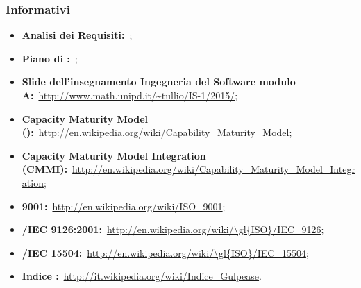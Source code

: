 	\subsubsection{Informativi}
	\begin{itemize}
		\item \textbf{Analisi dei Requisiti:}\ \ARdoc;
		\item \textbf{Piano di :}\ \PPdoc;
		\item \textbf{Slide dell’insegnamento Ingegneria del Software modulo A:}\ \url{http://www.math.unipd.it/~tullio/IS-1/2015/};
		\item \textbf{Capacity Maturity Model ():}\ \url{http://en.wikipedia.org/wiki/Capability_Maturity_Model};
		\item \textbf{Capacity Maturity Model Integration (CMMI):}\ \url{http://en.wikipedia.org/wiki/Capability_Maturity_Model_Integration};
		\item \textbf{ 9001:}\ \url{http://en.wikipedia.org/wiki/ISO_9001};
		\item \textbf{/IEC 9126:2001:}\ \url{http://en.wikipedia.org/wiki/\gl{ISO}/IEC_9126};
		\item \textbf{/IEC 15504:}\ \url{http://en.wikipedia.org/wiki/\gl{ISO}/IEC_15504};
		\item \textbf{Indice :}\ \url{http://it.wikipedia.org/wiki/Indice_Gulpease}.
	\end{itemize}
	


			
			